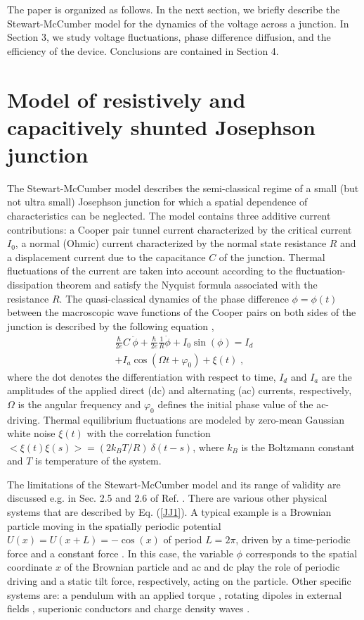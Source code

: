 \documentclass[a4,twocolumn,showpacs,showkeys]{revtex4}
\begin{document}
The paper is organized as follows. In the next 
section,  we briefly describe  the Stewart-McCumber model for the dynamics
of the voltage  across a junction. In Section 3, we study voltage fluctuations, 
phase difference diffusion,  and the efficiency of the device.
Conclusions are contained in  Section 4.

\section{Model of  resistively and capacitively shunted Josephson
  junction}

The Stewart-McCumber model describes the
semi-classical regime of a small (but not ultra small) Josephson
junction for which a spatial dependence of characteristics can be
neglected. The model contains three additive current contributions:
a Cooper pair tunnel current characterized by the critical current
$I_0$, a normal (Ohmic) current characterized by the normal state
resistance $R$ and a displacement current due to the capacitance $C$ of
the junction. Thermal fluctuations of the current are taken into
account according to the fluctuation-dissipation theorem and satisfy the Nyquist
formula associated with the resistance $R$. The quasi-classical
dynamics of the phase difference $\phi=\phi(t)$ between the
macroscopic wave functions of the Cooper pairs on both sides of
the junction is described by the following equation
\cite{barone,kautz},
%
\begin{eqnarray} \label{JJ1}
\frac{\hbar}{2e}  C\:\ddot{\phi} +  \frac{\hbar}{2e}  \frac{1}{R} \dot{\phi}
+  I_0 \sin (\phi) =  I_d  \nonumber\\
+ I_a \cos(\Omega t+\varphi_0) + \xi (t)\;, 
\end{eqnarray}
%
where the dot denotes the differentiation with respect to time, $I_d$ and
$I_a$ are the amplitudes of the applied direct (dc) and alternating (ac) 
currents,
respectively, $\Omega$ is the angular frequency and $\varphi_0$
defines the initial phase value of the ac-driving.  
Thermal equilibrium fluctuations are modeled by zero-mean 
Gaussian white noise $\xi(t)$ with   the correlation function  
$<\xi(t) \xi(s)> = (2 k_B T/R) \:\delta(t-s)$,  where  
$k_B$ is the Boltzmann constant and $T$ is  temperature of the
system. 

The limitations of the Stewart-McCumber model and its range of
validity are discussed e.g. in Sec. 2.5 and 2.6 of Ref.  \cite{kautz}.
There are various other physical systems that are described by
Eq. (\ref{JJ1}).  A typical example is a Brownian particle moving in the
spatially periodic potential $U(x)=U(x+L)= - \cos(x)$ of period $L=
2\pi$, driven by a time-periodic force and a constant force
\cite{machuraJPC}.  In this case, the variable $\phi$ corresponds to the spatial
coordinate $x$ of the Brownian particle and ac and dc
play the role of periodic driving and a static tilt force,
respectively, acting on the particle. Other specific
systems are: a pendulum with an applied torque \cite{barone}, rotating
dipoles in external fields \cite{Reg2000,Coffey}, superionic
conductors \cite{Ful1975} and charge density waves \cite{Gru1981}.
\end{document}

